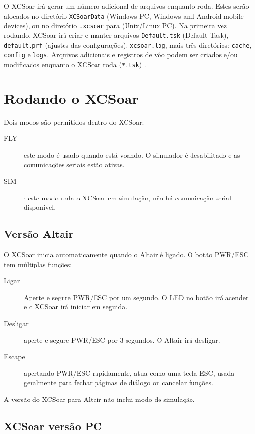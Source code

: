 O XCSoar irá gerar um número adicional de arquivos enquanto roda.  Estes serão alocados no diretório  \texttt{XCSoarData} (Windows PC, 
Windows and Android mobile devices), ou no diretório \texttt{.xcsoar} para (Unix/Linux
PC).  Na primeira vez rodando, XCSoar irá criar e manter arquivos
\texttt{Default.tsk} (Default Task),  
\texttt{default.prf} 
(ajustes das configurações),
\texttt{xcsoar.log}, 
mais três diretórios: \texttt{cache},
\texttt{config} e \texttt{logs}.  Arquivos adicionais e registros de vôo podem ser criados e/ou modificados enquanto o XCSoar roda (\texttt{*.tsk}) .


\section{Rodando o XCSoar}

Dois modos são permitidos dentro do XCSoar: 
\begin{description}
\item[FLY]este modo é usado quando está voando.  O simulador é desabilitado e as comunicações seriais estão ativas.
\item[SIM] :  este modo roda o XCSoar em simulação, não há comunicação serial disponível.
\end{description}

\subsection*{Versão Altair}
O XCSoar inicia automaticamente quando o Altair é ligado.  O botão PWR/ESC tem múltiplas funções:
\begin{description}
\item[Ligar]  Aperte e segure PWR/ESC por um segundo.  O LED no botão irá acender e o XCSoar irá iniciar em seguida.
\item[Desligar] aperte e segure PWR/ESC por 3 segundos.  O Altair irá desligar.
\item[Escape] apertando PWR/ESC rapidamente, atua como uma tecla ESC, usada geralmente para fechar páginas de diálogo ou cancelar funções.

\end{description}

A versão do XCSoar para Altair não inclui modo de simulação.

\subsection*{XCSoar versão PC}


